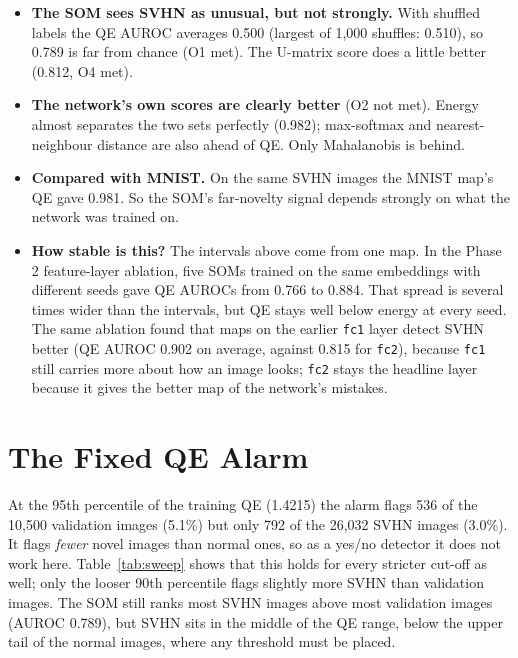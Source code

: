 \documentclass[11pt]{article}
\begin{document}
\begin{itemize}[leftmargin=1.4em, itemsep=2pt]
\item \textbf{The SOM sees SVHN as unusual, but not strongly.} With shuffled labels the QE AUROC averages 0.500 (largest of 1,000 shuffles: 0.510), so 0.789 is far from chance (O1 met). The U-matrix score does a little better (0.812, O4 met).
\item \textbf{The network's own scores are clearly better} (O2 not met). Energy almost separates the two sets perfectly (0.982); max-softmax and nearest-neighbour distance are also ahead of QE. Only Mahalanobis is behind.
\item \textbf{Compared with MNIST.} On the same SVHN images the MNIST map's QE gave 0.981. So the SOM's far-novelty signal depends strongly on what the network was trained on.
\item \textbf{How stable is this?} The intervals above come from one map. In the Phase 2 feature-layer ablation, five SOMs trained on the same embeddings with different seeds gave QE AUROCs from 0.766 to 0.884. That spread is several times wider than the intervals, but QE stays well below energy at every seed. The same ablation found that maps on the earlier \texttt{fc1} layer detect SVHN better (QE AUROC 0.902 on average, against 0.815 for \texttt{fc2}), because \texttt{fc1} still carries more about how an image looks; \texttt{fc2} stays the headline layer because it gives the better map of the network's mistakes.
\end{itemize}

\section{The Fixed QE Alarm}\label{sec:qeflag}

At the 95th percentile of the training QE (1.4215) the alarm flags 536 of the 10,500 validation images (5.1\%) but only 792 of the 26,032 SVHN images (3.0\%). It flags \emph{fewer} novel images than normal ones, so as a yes/no detector it does not work here. Table~\ref{tab:sweep} shows that this holds for every stricter cut-off as well; only the looser 90th percentile flags slightly more SVHN than validation images. The SOM still ranks most SVHN images above most validation images (AUROC 0.789), but SVHN sits in the middle of the QE range, below the upper tail of the normal images, where any threshold must be placed.
\end{document}

